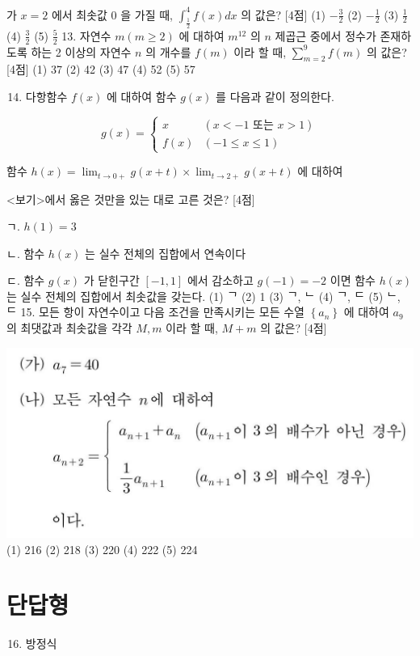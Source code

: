 \documentclass[10pt]{article}
\begin{document}
가 $x=2$ 에서 최솟값 0 을 가질 때, $\int_{\frac{1}{2}}^{4} f(x) d x$ 의 값은? [4점]
(1) $-\frac{3}{2}$
(2) $-\frac{1}{2}$
(3) $\frac{1}{2}$
(4) $\frac{3}{2}$
(5) $\frac{5}{2}$ 13. 자연수 $m(m \geq 2)$ 에 대하여 $m^{12}$ 의 $n$ 제곱근 중에서 정수가 존재하도록 하는 2 이상의 자연수 $n$ 의 개수를 $f(m)$ 이라 할 때, $\sum_{m=2}^{9} f(m)$ 의 값은? [4점]
(1) 37
(2) 42
(3) 47
(4) 52
(5) 57

\begin{enumerate}
  \setcounter{enumi}{13}
  \item 다항함수 $f(x)$ 에 대하여 함수 $g(x)$ 를 다음과 같이 정의한다.
\end{enumerate}

$$
g(x)= \begin{cases}x & (x<-1 \text { 또는 } x>1) \\ f(x) & (-1 \leq x \leq 1)\end{cases}
$$

함수 $h(x)=\lim _{t \rightarrow 0+} g(x+t) \times \lim _{t \rightarrow 2+} g(x+t)$ 에 대하여

<보기>에서 옳은 것만을 있는 대로 고른 것은? [4점]

ㄱ. $h(1)=3$

ㄴ. 함수 $h(x)$ 는 실수 전체의 집합에서 연속이다

ㄷ. 함수 $g(x)$ 가 닫힌구간 $[-1,1]$ 에서 감소하고 $g(-1)=-2$ 이면 함수 $h(x)$ 는 실수 전체의 집합에서 최솟값을 갖는다.
(1) ᄀ
(2) 1
(3) ᄀ, ᄂ (4) ᄀ, ᄃ
(5) ᄂ, ᄃ 15. 모든 항이 자연수이고 다음 조건을 만족시키는 모든 수열 $\left\{a_{n}\right\}$ 에 대하여 $a_{9}$ 의 최댓값과 최솟값을 각각 $M, m$ 이라 할 때, $M+m$ 의 값은? [4점]

\includegraphics[max width=\textwidth, center]{2023_05_20_665dd8a057732da498f1g-06}
(1) 216
(2) 218
(3) 220
(4) 222
(5) 224

\section{단답형}
\begin{enumerate}
  \setcounter{enumi}{15}
  \item 방정식
\end{enumerate}
\end{document}
